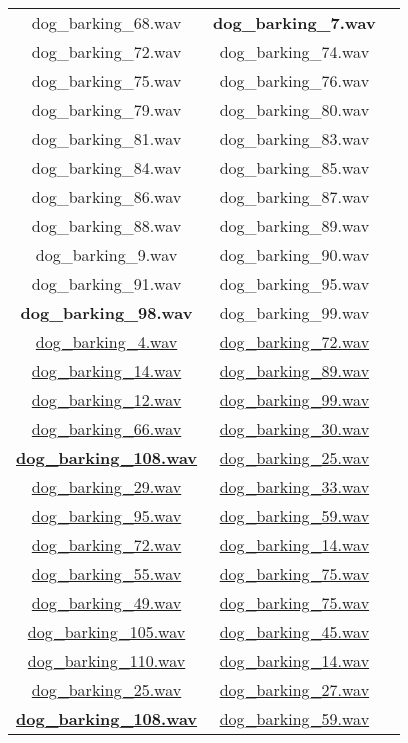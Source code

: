 \documentclass[twocolumn,10pt]{asme2ej}
\begin{document}
\begin{table}[h]
\begin{tabular}{ccc}
dog\_barking\_68.wav & \textbf{dog\_barking\_7.wav}\\
dog\_barking\_72.wav & dog\_barking\_74.wav\\
dog\_barking\_75.wav & dog\_barking\_76.wav\\
dog\_barking\_79.wav & dog\_barking\_80.wav\\
dog\_barking\_81.wav & dog\_barking\_83.wav\\
dog\_barking\_84.wav & dog\_barking\_85.wav\\
dog\_barking\_86.wav & dog\_barking\_87.wav\\
dog\_barking\_88.wav & dog\_barking\_89.wav\\
dog\_barking\_9.wav & dog\_barking\_90.wav\\
dog\_barking\_91.wav & dog\_barking\_95.wav\\
\textbf{dog\_barking\_98.wav} & dog\_barking\_99.wav\\
\underline{dog\_barking\_4.wav} & \underline{dog\_barking\_72.wav}\\
\underline{dog\_barking\_14.wav} & \underline{dog\_barking\_89.wav}\\
\underline{dog\_barking\_12.wav} & \underline{dog\_barking\_99.wav}\\
\underline{dog\_barking\_66.wav} & \underline{dog\_barking\_30.wav}\\
\textbf{\underline{dog\_barking\_108.wav}} & \underline{dog\_barking\_25.wav}\\
\underline{dog\_barking\_29.wav} & \underline{dog\_barking\_33.wav}\\
\underline{dog\_barking\_95.wav} & \underline{dog\_barking\_59.wav}\\
\underline{dog\_barking\_72.wav} & \underline{dog\_barking\_14.wav}\\
\underline{dog\_barking\_55.wav} & \underline{dog\_barking\_75.wav}\\
\underline{dog\_barking\_49.wav} & \underline{dog\_barking\_75.wav}\\
\underline{dog\_barking\_105.wav} & \underline{dog\_barking\_45.wav}\\
\underline{dog\_barking\_110.wav} & \underline{dog\_barking\_14.wav}\\
\underline{dog\_barking\_25.wav} & \underline{dog\_barking\_27.wav}\\
\textbf{\underline{dog\_barking\_108.wav}} & \underline{dog\_barking\_59.wav}\\

\end{tabular}
\end{table}
\end{document}
